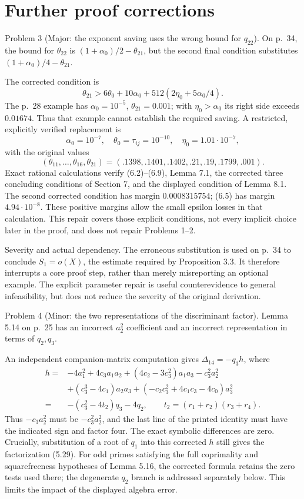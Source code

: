 \documentclass[10pt]{article}
\begin{document}
\section*{Further proof corrections}
Problem 3 (Major: the exponent saving uses the wrong bound for \(q_{22}\)).  On p. 34, the bound for \(\theta_{22}\) is \((1+\alpha_0)/2-\theta_{21}\), but the second final condition substitutes \((1+\alpha_0)/4-\theta_{21}\).\par
The corrected condition is \[\theta_{21}>6\theta_0+10\alpha_0+
 512(2\eta_0+5\alpha_0/4).\] The p. 28 example has \(\alpha_0=10^{-5}\), \(\theta_{21}=0.001\); with \(\eta_0>\alpha_0\) its right side exceeds \(0.01674\). Thus that example cannot establish the required saving. A restricted, explicitly verified replacement is \[\alpha_0=10^{-7},\quad \theta_0=\tau_{ij}=10^{-10},
 \quad\eta_0=1.01\cdot10^{-7},\] with the original values \[(\theta_{11},\ldots,\theta_{16},\theta_{21})
 =(.1398,.1401,.1402,.21,.19,.1799,.001).\] Exact rational calculations verify (6.2)–(6.9), Lemma 7.1, the corrected three concluding conditions of Section 7, and the displayed condition of Lemma 8.1. The second corrected condition has margin \(0.0008315754\); (6.5) has margin \(4.94\cdot10^{-8}\). These positive margins allow the small epsilon losses in that calculation. This repair covers those explicit conditions, not every implicit choice later in the proof, and does not repair Problems 1–2.\par
Severity and actual dependency. The erroneous substitution is used on p. 34 to conclude \(S_1=o(X)\), the estimate required by Proposition 3.3. It therefore interrupts a core proof step, rather than merely misreporting an optional example. The explicit parameter repair is useful counterevidence to general infeasibility, but does not reduce the severity of the original derivation.\par
Problem 4 (Minor: the two representations of the discriminant factor).  Lemma 5.14 on p. 25 has an incorrect \(a_2^2\) coefficient and an incorrect representation in terms of \(q_2,q_3\).\par
An independent companion-matrix computation gives \(\Delta_{14}=-q_3h\), where \[\begin{aligned}
h={}&-4a_1^2+4c_3a_1a_2+(4c_2-3c_3^2)a_1a_3-c_3^2a_2^2\\
 &+(c_3^3-4c_1)a_2a_3+
 (-c_2c_3^2+4c_1c_3-4c_0)a_3^2\\
={}&-(c_3^2-4t_2)q_3-4q_2,\qquad
 t_2=(r_1+r_2)(r_3+r_4).\end{aligned}\] Thus \(-c_3a_2^2\) must be \(-c_3^2a_2^2\), and the last line of the printed identity must have the indicated sign and factor four. The exact symbolic differences are zero. Crucially, substitution of a root of \(q_1\) into this corrected \(h\) still gives the factorization (5.29). For odd primes satisfying the full coprimality and squarefreeness hypotheses of Lemma 5.16, the corrected formula retains the zero tests used there; the degenerate \(q_2\) branch is addressed separately below. This limits the impact of the displayed algebra error.\par
\end{document}
